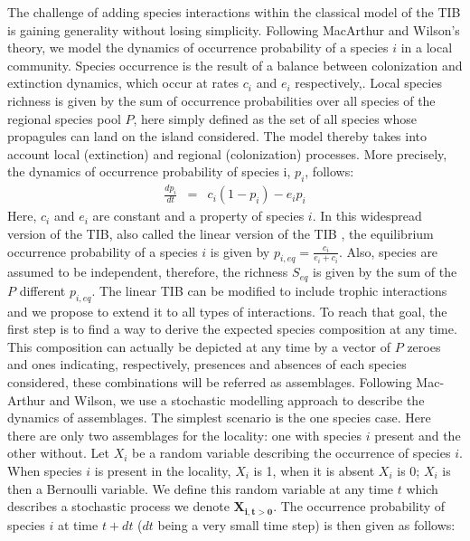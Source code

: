 The challenge of adding species interactions within the classical model of the TIB is gaining generality without losing simplicity. Following MacArthur and Wilson's theory, we model the dynamics of occurrence probability of a species $i$ in a local community. Species occurrence is the result of a balance between colonization and extinction dynamics, which occur at rates $c_i$ and $e_i$ respectively,. Local species richness is given by the sum of occurrence probabilities over all species of the regional species pool $P$, here simply defined as the set of all species whose propagules \citep[as defined in][]{Simberloff1969} can land on the island considered. The model thereby takes into account local (extinction) and regional (colonization) processes. More precisely, the dynamics of occurrence probability of species i, $p_i$, follows:
\begin{eqnarray}
\label{chap1eq1} \frac{dp_{i}}{dt}&=&c_i(1-p_{i})-e_ip_{i}
\end{eqnarray}
Here, $c_i$ and $e_i$ are constant and a property of species $i$. In this widespread version of the TIB, also called the linear version of the TIB \citep{Schoener2010}, the equilibrium occurrence probability of a species $i$ is given by $p_{i,eq}=\frac{c_i}{e_i+c_i}$. Also, species are assumed to be independent, therefore, the richness $S_{eq}$ is given by the sum of the $P$ different $p_{i,eq}$. The linear TIB can be modified to include trophic interactions \citep[after][]{Gravel2011} and we propose to extend it to all types of interactions. To reach that goal, the first step is to find a way to derive the expected species composition at any time. This composition can actually be depicted at any time by a vector of $P$ zeroes and ones indicating, respectively, presences and absences of each species considered, these combinations will be referred as assemblages. Following Mac-Arthur and Wilson, we use a stochastic modelling approach to describe the dynamics of assemblages. The simplest scenario is the one species case. Here there are only two assemblages for the locality: one with species $i$ present and the other without. Let $X_{i}$ be a random variable describing the occurrence of species $i$. When species $i$ is present in the locality, $X_i$ is 1, when it is absent $X_i$ is 0; $X_i$ is then a Bernoulli variable.
We define this random variable at any time $t$ which describes a stochastic process we denote $\mathbf{X_{i,t>0}}$. The occurrence probability of species $i$ at time $t+dt$ ($dt$ being a very small time step) is then given as follows:
